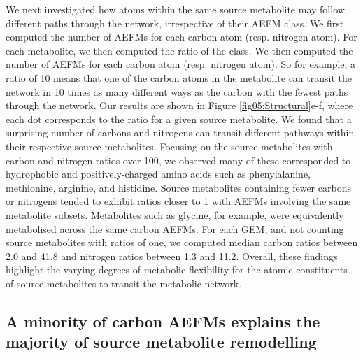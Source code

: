 \documentclass[12pt]{article}
\begin{document}
We next investigated how atoms within the same source metabolite may
follow different paths through the network, irrespective of their AEFM
class. We first computed the number of AEFMs for each carbon atom (resp.
nitrogen atom). For each metabolite, we then computed the ratio of the
class. We then computed the number of AEFMs for each carbon atom (resp.
nitrogen atom). So for example, a ratio of 10 means that one of the carbon
atoms in the metabolite can transit the network in 10 times as many
different ways as the carbon with the fewest paths through the network.
Our results are shown in Figure \ref{fig05:Structural}e-f, where each dot
corresponds to the ratio for a given source metabolite. We found that
a surprising number of carbons and nitrogens can transit different
pathways within their respective source metabolites. Focusing on the
source metabolites with carbon and nitrogen ratios over 100, we observed
many of these corresponded to hydrophobic and positively-charged amino
acids such as phenylalanine, methionine, arginine, and histidine. Source
metabolites containing fewer carbons or nitrogens tended to exhibit ratios
closer to 1 with AEFMs involving the same metabolite subsets. Metabolites
such as glycine, for example, were equivalently metabolised across the
same carbon AEFMs. For each GEM, and not counting source metabolites with
ratios of one, we computed median carbon ratios between 2.0 and 41.8 and
nitrogen ratios between 1.3 and 11.2. Overall, these findings highlight
the varying degrees of metabolic flexibility for the atomic constituents
of source metabolites to transit the metabolic network.

\subsection*{A minority of carbon AEFMs explains the majority of source metabolite remodelling}



\end{document}
